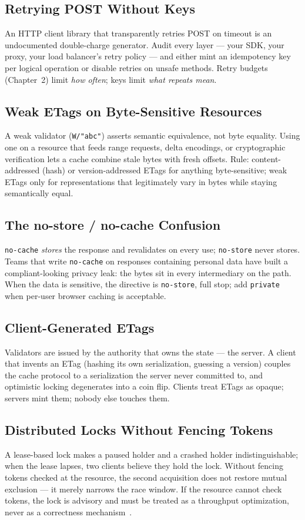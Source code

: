 \subsection{Retrying POST Without Keys}
An HTTP client library that transparently retries POST on timeout is an
undocumented double-charge generator. Audit every layer --- your SDK, your
proxy, your load balancer's retry policy --- and either mint an idempotency
key per logical operation or disable retries on unsafe methods. Retry
budgets (Chapter~2) limit \emph{how often}; keys limit \emph{what repeats
mean}.

\subsection{Weak ETags on Byte-Sensitive Resources}
A weak validator (\texttt{W/"abc"}) asserts semantic equivalence, not byte
equality. Using one on a resource that feeds range requests, delta
encodings, or cryptographic verification lets a cache combine stale bytes
with fresh offsets. Rule: content-addressed (hash) or version-addressed
ETags for anything byte-sensitive; weak ETags only for representations that
legitimately vary in bytes while staying semantically equal.

\subsection{The no-store / no-cache Confusion}
\texttt{no-cache} \emph{stores} the response and revalidates on every use;
\texttt{no-store} never stores. Teams that write \texttt{no-cache} on
responses containing personal data have built a compliant-looking privacy
leak: the bytes sit in every intermediary on the path. When the data is
sensitive, the directive is \texttt{no-store}, full stop; add
\texttt{private} when per-user browser caching is acceptable.

\subsection{Client-Generated ETags}
Validators are issued by the authority that owns the state --- the server.
A client that invents an ETag (hashing its own serialization, guessing a
version) couples the cache protocol to a serialization the server never
committed to, and optimistic locking degenerates into a coin flip. Clients
treat ETags as opaque; servers mint them; nobody else touches them.

\subsection{Distributed Locks Without Fencing Tokens}
A lease-based lock makes a paused holder and a crashed holder
indistinguishable; when the lease lapses, two clients believe they hold the
lock. Without fencing tokens checked at the resource, the second acquisition
does not restore mutual exclusion --- it merely narrows the race window.
If the resource cannot check tokens, the lock is advisory and must be
treated as a throughput optimization, never as a correctness
mechanism~\cite{kleppmann2017ddia}.

